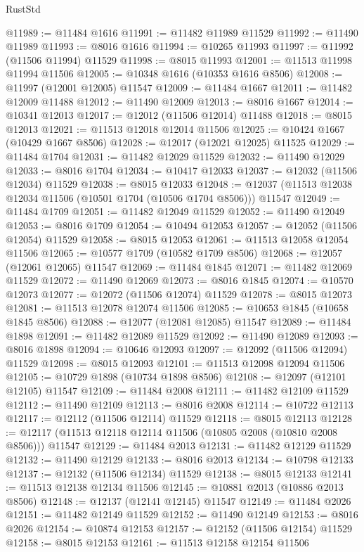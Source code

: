 \begin{lexlean}{RustStd}
\begin{coremodule}
@11989 := @11484 @1616
@11991 := @11482 @11989 @11529
@11992 := @11490 @11989
@11993 := @8016 @1616
@11994 := @10265 @11993
@11997 := @11992 (@11506 @11994) @11529
@11998 := @8015 @11993
@12001 := @11513 @11998 @11994 @11506
@12005 := @10348 @1616 (@10353 @1616 @8506)
@12008 := @11997 (@12001 @12005) @11547
@12009 := @11484 @1667
@12011 := @11482 @12009 @11488
@12012 := @11490 @12009
@12013 := @8016 @1667
@12014 := @10341 @12013
@12017 := @12012 (@11506 @12014) @11488
@12018 := @8015 @12013
@12021 := @11513 @12018 @12014 @11506
@12025 := @10424 @1667 (@10429 @1667 @8506)
@12028 := @12017 (@12021 @12025) @11525
@12029 := @11484 @1704
@12031 := @11482 @12029 @11529
@12032 := @11490 @12029
@12033 := @8016 @1704
@12034 := @10417 @12033
@12037 := @12032 (@11506 @12034) @11529
@12038 := @8015 @12033
@12048 := @12037 (@11513 @12038 @12034 @11506 (@10501 @1704 (@10506 @1704 @8506))) @11547
@12049 := @11484 @1709
@12051 := @11482 @12049 @11529
@12052 := @11490 @12049
@12053 := @8016 @1709
@12054 := @10494 @12053
@12057 := @12052 (@11506 @12054) @11529
@12058 := @8015 @12053
@12061 := @11513 @12058 @12054 @11506
@12065 := @10577 @1709 (@10582 @1709 @8506)
@12068 := @12057 (@12061 @12065) @11547
@12069 := @11484 @1845
@12071 := @11482 @12069 @11529
@12072 := @11490 @12069
@12073 := @8016 @1845
@12074 := @10570 @12073
@12077 := @12072 (@11506 @12074) @11529
@12078 := @8015 @12073
@12081 := @11513 @12078 @12074 @11506
@12085 := @10653 @1845 (@10658 @1845 @8506)
@12088 := @12077 (@12081 @12085) @11547
@12089 := @11484 @1898
@12091 := @11482 @12089 @11529
@12092 := @11490 @12089
@12093 := @8016 @1898
@12094 := @10646 @12093
@12097 := @12092 (@11506 @12094) @11529
@12098 := @8015 @12093
@12101 := @11513 @12098 @12094 @11506
@12105 := @10729 @1898 (@10734 @1898 @8506)
@12108 := @12097 (@12101 @12105) @11547
@12109 := @11484 @2008
@12111 := @11482 @12109 @11529
@12112 := @11490 @12109
@12113 := @8016 @2008
@12114 := @10722 @12113
@12117 := @12112 (@11506 @12114) @11529
@12118 := @8015 @12113
@12128 := @12117 (@11513 @12118 @12114 @11506 (@10805 @2008 (@10810 @2008 @8506))) @11547
@12129 := @11484 @2013
@12131 := @11482 @12129 @11529
@12132 := @11490 @12129
@12133 := @8016 @2013
@12134 := @10798 @12133
@12137 := @12132 (@11506 @12134) @11529
@12138 := @8015 @12133
@12141 := @11513 @12138 @12134 @11506
@12145 := @10881 @2013 (@10886 @2013 @8506)
@12148 := @12137 (@12141 @12145) @11547
@12149 := @11484 @2026
@12151 := @11482 @12149 @11529
@12152 := @11490 @12149
@12153 := @8016 @2026
@12154 := @10874 @12153
@12157 := @12152 (@11506 @12154) @11529
@12158 := @8015 @12153
@12161 := @11513 @12158 @12154 @11506

\end{coremodule}
\end{lexlean}
